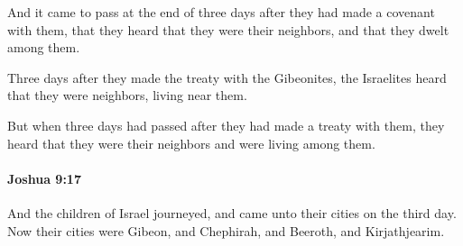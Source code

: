 			\begin{versebox}
					\item[BHS] 
					\item[ASV] And it came to pass at the end of three days after they had made a covenant with them, that they heard that they were their neighbors, and that they dwelt among them.
					\item[NIV] Three days after they made the treaty with the Gibeonites, the Israelites heard that they were neighbors, living near them.
					\item[NRSV] But when three days had passed after they had made a treaty with them, they heard that they were their neighbors and were living among them.
			\end{versebox}

		\paragraph{Joshua 9:17} %
			\label{JOSHUA-9-17}

			And the children of Israel journeyed, and came unto their cities on the third day. Now their cities were Gibeon, and Chephirah, and Beeroth, and Kirjathjearim.


